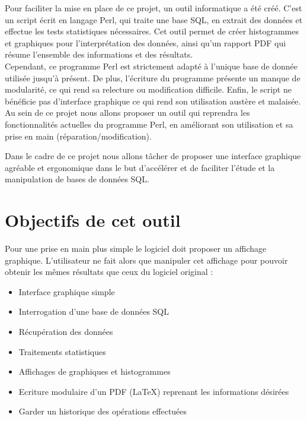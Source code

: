 \documentclass[a4paper]{report}
\begin{document}
Pour faciliter la mise en place de ce projet, un outil informatique a été créé. C'est un script écrit en langage Perl, qui traite une base SQL, en extrait des données et effectue les tests statistiques nécessaires.
Cet outil permet de créer histogrammes et graphiques pour l'interprétation des données, ainsi qu'un rapport PDF qui résume l'ensemble des informations et des résultats.\\

Cependant, ce programme Perl est strictement adapté à l'unique base de donnée utilisée jusqu'à présent.
De plus, l'écriture du programme présente un manque de modularité, ce qui rend sa relecture ou modification difficile. 
Enfin, le script ne bénéficie pas d'interface graphique ce qui rend son utilisation austère et malaisée.\\

Au sein de ce projet nous allons proposer un outil qui reprendra les fonctionnalités actuelles du programme Perl, en améliorant son utilisation et sa prise en main (réparation/modification).

Dans le cadre de ce projet nous allons tâcher de proposer une interface graphique agréable et ergonomique dans le but d'accélérer et de faciliter l'étude et la manipulation de bases de données SQL.

\section{Objectifs de cet outil}

Pour une prise en main plus simple le logiciel doit proposer un affichage graphique.
L'utilisateur ne fait alors que manipuler cet affichage pour pouvoir obtenir les mêmes résultats que ceux du logiciel original :\\
\begin{itemize}
\item Interface graphique simple
\item Interrogation d'une base de données SQL
\item Récupération des données
\item Traitements statistiques
\item Affichages de graphiques et histogrammes
\item Ecriture modulaire d'un PDF (\LaTeX) reprenant les informations désirées
\item Garder un historique des opérations effectuées\\
\end{itemize}
\end{document}
